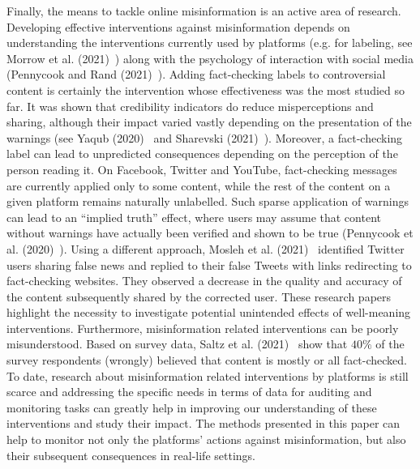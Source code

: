 \documentclass{article}
\begin{document}
Finally, the means to tackle online misinformation is an active area of research. Developing effective interventions against misinformation depends on understanding the interventions currently used by platforms (e.g. for labeling, see Morrow et al. (2021)~\cite{morrow}) along with the psychology of interaction with social media (Pennycook and Rand (2021)~\cite{pennycook2021psychology}). 
Adding fact-checking labels to controversial content is certainly the intervention whose effectiveness was the most studied so far. 
It was shown that credibility indicators do reduce misperceptions and sharing, although their impact varied vastly depending on the presentation of the warnings (see Yaqub (2020)~\cite{yaqub2020effects} and Sharevski (2021)~\cite{sharevski2021misinformation}).
Moreover, a fact-checking label can lead to unpredicted consequences depending on the perception of the person reading it.
On Facebook, Twitter and YouTube, fact-checking messages are currently applied only to some content, while the rest of the content on a given platform remains naturally unlabelled. 
Such sparse application of warnings can lead to an ``implied truth'' effect, where users may assume that content without warnings have actually been verified and shown to be true (Pennycook et al. (2020)~\cite{pennycook2020implied}).
Using a different approach, Mosleh et al. (2021)~\cite{mosleh2021perverse} identified Twitter users sharing false news and replied to their false Tweets with links redirecting to fact-checking websites.
They observed a decrease in the quality and accuracy of the content subsequently shared by the corrected user. 
These research papers highlight the necessity to investigate potential unintended effects of well-meaning interventions. Furthermore, misinformation related interventions can be poorly misunderstood. Based on survey data, Saltz et al. (2021)~\cite{saltzbarrari} show that $40\%$ of the survey respondents (wrongly) believed that content is mostly or all fact-checked. To date, research about misinformation related interventions by platforms is still scarce and addressing the specific needs in terms of data for auditing and monitoring tasks can greatly help in improving our understanding of these interventions and study their impact.  
The methods presented in this paper can help to monitor not only the platforms' actions against misinformation, but also their subsequent consequences in real-life settings.


	
\end{document}
